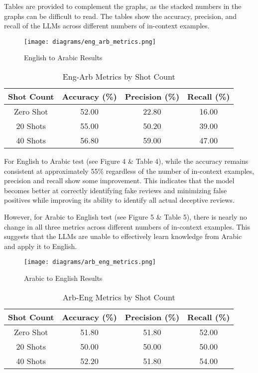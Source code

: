 \documentclass[sigconf, nonacm]{acmart}
\theoremstyle{definition}
\begin{document}
Tables are provided to complement the graphs, as the stacked numbers in the graphs can be difficult to read. The tables show the accuracy, precision, and recall of the LLMs across different numbers of in-context examples.

\begin{figure}[h]
  \centering
  \texttt{[image: diagrams/eng\_arb\_metrics.png]}
  \caption{English to Arabic Results}
\end{figure}

\begin{table}[h!]
  \centering
  \caption{Eng-Arb Metrics by Shot Count}
  \begin{tabular}{c c c c}
    \toprule
    Shot Count & Accuracy (\%) & Precision (\%) & Recall (\%) \\
    \midrule
    Zero Shot  & 52.00         & 22.80          & 16.00       \\
    20 Shots   & 55.00         & 50.20          & 39.00       \\
    40 Shots   & 56.80         & 59.00          & 47.00       \\
    \bottomrule
  \end{tabular}
\end{table}

For English to Arabic test (see Figure 4 \& Table 4), while the accuracy remains consistent at approximately 55\% regardless of the number of in-context examples, precision and recall show some improvement. This indicates that the model becomes better at correctly identifying fake reviews and minimizing false positives while improving its ability to identify all actual deceptive reviews.

However, for Arabic to English test (see Figure 5 \& Table 5), there is nearly no change in all three metrics across different numbers of in-context examples. This suggests that the LLMs are unable to effectively learn knowledge from Arabic and apply it to English.

\begin{figure}[h]
  \centering
  \texttt{[image: diagrams/arb\_eng\_metrics.png]}
  \caption{Arabic to English Results}
\end{figure}

\begin{table}[h!]
  \centering
  \caption{Arb-Eng Metrics by Shot Count}
  \begin{tabular}{c c c c}
    \toprule
    Shot Count & Accuracy (\%) & Precision (\%) & Recall (\%) \\
    \midrule
    Zero Shot  & 51.80         & 51.80          & 52.00       \\
    20 Shots   & 50.00         & 50.00          & 50.00       \\
    40 Shots   & 52.20         & 51.80          & 54.00       \\
    \bottomrule
  \end{tabular}
\end{table}
\end{document}
